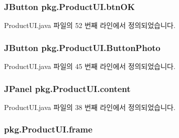 \subsubsection[{\texorpdfstring{btn\+OK}{btnOK}}]{\setlength{\rightskip}{0pt plus 5cm}J\+Button pkg.\+Product\+U\+I.\+btn\+OK\hspace{0.3cm}{\ttfamily [private]}}\hypertarget{classpkg_1_1_product_u_i_ae48c36617559f56735461306acc07166}{}\label{classpkg_1_1_product_u_i_ae48c36617559f56735461306acc07166}


Product\+U\+I.\+java 파일의 52 번째 라인에서 정의되었습니다.

\subsubsection[{\texorpdfstring{Button\+Photo}{ButtonPhoto}}]{\setlength{\rightskip}{0pt plus 5cm}J\+Button pkg.\+Product\+U\+I.\+Button\+Photo\hspace{0.3cm}{\ttfamily [private]}}\hypertarget{classpkg_1_1_product_u_i_a8d114c269e1d1294e82573b7e54e4c54}{}\label{classpkg_1_1_product_u_i_a8d114c269e1d1294e82573b7e54e4c54}


Product\+U\+I.\+java 파일의 45 번째 라인에서 정의되었습니다.

\subsubsection[{\texorpdfstring{content}{content}}]{\setlength{\rightskip}{0pt plus 5cm}J\+Panel pkg.\+Product\+U\+I.\+content\hspace{0.3cm}{\ttfamily [private]}}\hypertarget{classpkg_1_1_product_u_i_a4b906446ebd18ba32a11ace86f26fe12}{}\label{classpkg_1_1_product_u_i_a4b906446ebd18ba32a11ace86f26fe12}


Product\+U\+I.\+java 파일의 38 번째 라인에서 정의되었습니다.

\subsubsection[{\texorpdfstring{frame}{frame}}]{ pkg.\+Product\+U\+I.\+frame\hspace{0.3cm}{\ttfamily [private]}}\hypertarget{classpkg_1_1_product_u_i_a49f9ae805cdac34c866e6c1593b6e625}{}\label{classpkg_1_1_product_u_i_a49f9ae805cdac34c866e6c1593b6e625}


